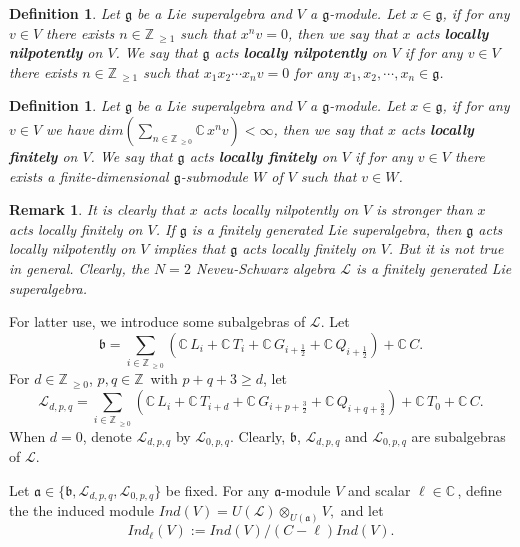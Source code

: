 \documentclass[12pt]{article}
\def\ssc{\scriptscriptstyle}
\def\Z{\mathbb{Z}{\ssc\,}}
\def\C{\mathbb{C}{\ssc\,}}
\numberwithin{equation}{section}
\newtheorem{defi}[theo]{Definition}
\newtheorem{rema}[theo]{Remark}
\begin{document}
\begin{defi} Let $\mathfrak{g}$ be a Lie superalgebra and $V$ a $\mathfrak{g}$-module. Let $x\in \mathfrak{g}$,
if for any $v\in V$ there exists $n\in \Z_{\ge 1}$ such that $x^nv=0$, then we say that  $x$ acts
 {\bf  locally nilpotently}  on $V$. We say that $\mathfrak{g}$ acts {\bf locally nilpotently} on $V$
if for any $v\in V$ there exists $n\in \Z_{\ge 1}$ such that $x_1x_2\cdots x_nv=0$ for any $x_1,x_2,\cdots, x_n\in \mathfrak{g}$.
\end{defi}

\begin{defi} Let $\mathfrak{g}$ be a Lie superalgebra and $V$ a $\mathfrak{g}$-module. Let $x\in \mathfrak{g}$,
if for any $v\in V$ we have ${ dim}(\sum_{n\in\Z_{\ge 0}}\C x^nv)<\infty$,  then we say that  $x$ acts
{\bf  locally finitely} on $V$. We say  that  $\mathfrak{g}$  acts {\bf locally finitely} on $V$
if for any $v\in V$  there exists a finite-dimensional $\mathfrak{g}$-submodule $W$ of $V$ such that $v\in W$.
\end{defi}

\begin{rema}It is clearly that $x$ acts locally nilpotently on $V$ is stronger than $x$ acts locally finitely on $V$. If $\mathfrak{g}$ is a finitely generated Lie superalgebra, then
 $\mathfrak{g}$ acts locally nilpotently on $V$ implies that $\mathfrak{g}$ acts locally finitely on $V$.
 But it is not true in general. Clearly, the $N=2$ Neveu-Schwarz algebra $\mathcal{L}$ is a finitely generated Lie superalgebra.
\end{rema}


For latter use, we introduce some subalgebras of $\mathcal{L}$. Let
$$\mathfrak{b}=\sum\limits_{i\in\Z_{\ge 0}}(\C L_i+\C T_{i}+\C G_{i+\frac{1}{2}}+\C Q_{i+\frac{1}{2}})+\C C.$$
For $d\in \Z_{\ge 0}$, $p,q\in\Z$ with $p+q+3\ge  d$, let
$$\mathcal{L}_{d,p,q}=\sum\limits_{i\in\Z_{\ge 0}}(\C L_i+\C T_{i+d}+\C G_{i+p+\frac{3}{2}}+\C Q_{i+q+\frac{3}{2}})+\C T_0+\C C.$$
When $d=0$, denote $\mathcal{L}_{d,p,q}$ by $\mathcal{L}_{0,p,q}$.
Clearly, $\mathfrak{b}$, $\mathcal{L}_{d,p,q}$ and $\mathcal{L}_{0,p,q}$  are  subalgebras of $\mathcal{L}$.


Let $\mathfrak{a}\in\{\mathfrak{b},\mathcal{L}_{d,p,q},\mathcal{L}_{0,p,q}\}$ be fixed. For any $\mathfrak{a}$-module $V$ and scalar $\ell\in\C$,  define the the  induced module
$Ind(V)=U(\mathcal{L})\otimes_{U(\mathfrak{a})}V,$ and let
$$Ind_{\ell}(V):=Ind(V)/(C-\ell)Ind(V).$$
\end{document}

